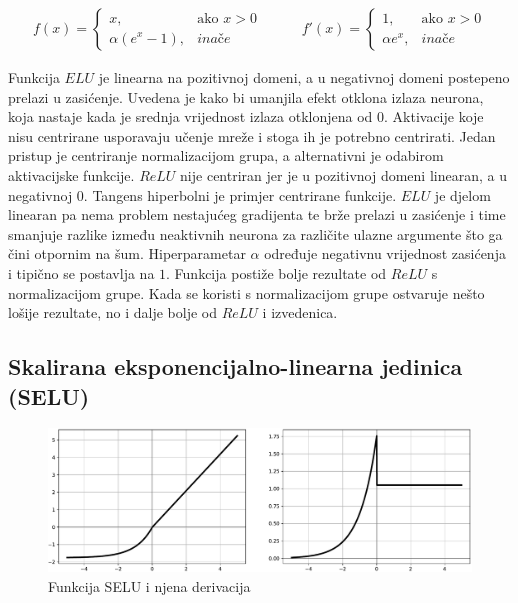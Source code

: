 \documentclass[times, utf8, numeric, diplomski]{fer}
\def\otherwise{\textit{inače}}
\begin{document}
\begin{equation}
\label{eq:elu}
\begin{split}
f(x) = 
\begin{cases}
x,					& \text{ako } x > 0 \\
\alpha (e^x - 1),	& \otherwise
\end{cases}
\end{split}
\qquad
\begin{split}
f'(x) = 
\begin{cases}
1,	 		& \text{ako } x > 0 \\
\alpha e^x,	& \otherwise
\end{cases}
\end{split}
\end{equation}

Funkcija $ELU$ je linearna na pozitivnoj domeni, a u negativnoj domeni postepeno prelazi u zasićenje. Uvedena je kako bi umanjila efekt otklona izlaza neurona, koja nastaje kada je srednja vrijednost izlaza otklonjena od $0$. Aktivacije koje nisu centrirane usporavaju učenje mreže i stoga ih je potrebno centrirati. Jedan pristup je centriranje normalizacijom grupa, a alternativni je odabirom aktivacijske funkcije. $ReLU$ nije centriran jer je u pozitivnoj domeni linearan, a u negativnoj $0$. Tangens hiperbolni je primjer centrirane funkcije. $ELU$ je djelom linearan pa nema problem nestajućeg gradijenta te brže prelazi u zasićenje i time smanjuje razlike između neaktivnih neurona za različite ulazne argumente što ga čini otpornim na šum. Hiperparametar $\alpha$ određuje negativnu vrijednost zasićenja i tipično se postavlja na $1$. Funkcija postiže bolje rezultate od $ReLU$ s normalizacijom grupe. Kada se koristi s normalizacijom grupe ostvaruje nešto lošije rezultate, no i dalje bolje od $ReLU$ i izvedenica. \citep{elu}

\subsection{Skalirana eksponencijalno-linearna jedinica (SELU)}

\begin{figure}[H]
\includegraphics[width=\textwidth]{func_SELU.pdf}
\centering
\caption{Funkcija SELU i njena derivacija}
\label{fig:selu}
\end{figure}
\end{document}
